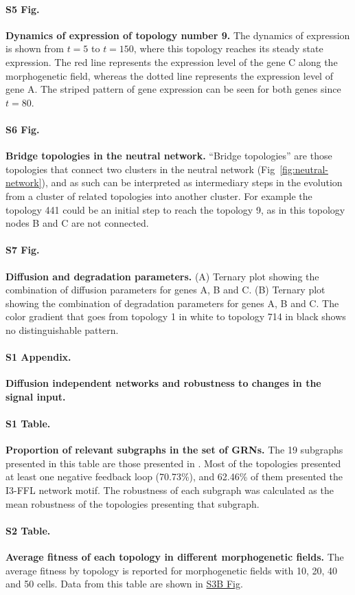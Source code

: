 \documentclass[10pt,letterpaper]{article}
\begin{document}
\paragraph*{S5 Fig.}
\label{S5_Fig}
{\bf Dynamics of expression of topology number 9.}
The dynamics of expression is shown from $t = 5$ to $t = 150$, where this
topology reaches its steady state expression. The red line
represents the expression level of the gene C along the morphogenetic field,
whereas the dotted line represents the expression level of gene A. The
striped pattern of gene expression can be seen for both genes since $t = 80$.

\paragraph*{S6 Fig.}
\label{S6_Fig}
{\bf Bridge topologies in the neutral network.}
``Bridge topologies'' are those topologies that connect two clusters in the neutral
network (Fig~\ref{fig:neutral-network}), and as such can be interpreted as
intermediary steps in the evolution from a cluster of related topologies into
another cluster. For example the topology 441 could be an initial step to reach the
topology 9, as in this topology nodes B and C are not connected.

\paragraph*{S7 Fig.}
\label{S7_Fig}
{\bf Diffusion and degradation parameters.}
(A) Ternary plot showing the combination of diffusion parameters for genes A,
B and C. (B) Ternary plot showing the combination of degradation parameters
for genes A, B and C. The color gradient that goes from topology 1 in white to
topology 714 in black shows no distinguishable pattern.

\paragraph*{S1 Appendix.}
\label{S1_Appendix}
{\bf Diffusion independent networks and robustness to changes in the signal input.}

\paragraph*{S1 Table.}
\label{S1_Table}
{\bf Proportion of relevant subgraphs in the set of GRNs.}
The 19 subgraphs presented in this table are those presented in .
Most of the topologies presented at least one negative feedback loop (70.73\%),
and 62.46\% of them presented the I3-FFL network motif. The robustness of each
subgraph was calculated as the mean robustness of the topologies presenting that
subgraph.

\paragraph*{S2 Table.}
\label{S2_Table}
{\bf Average fitness of each topology in different morphogenetic fields.}
The average fitness by topology is reported for morphogenetic fields with 10, 20,
40 and 50 cells. Data from this table are shown in \hyperref[S3_Fig]{S3B Fig}.
\end{document}
